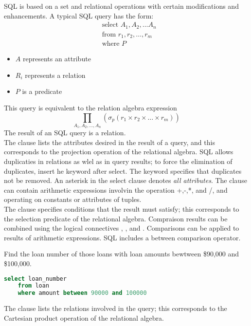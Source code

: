 \documentclass{article}
\begin{document}
SQL is based on a set and relational operations with certain modifications and enhancements. A typical SQL query has the form: 
\begin{align*}
  &\textrm{select } A_1 , A_2 , \dots A_n \\ 
  &\textrm{from } r_1 , r_2 , \dots , r_m \\ 
  &\textrm{where } P 
\end{align*}
\begin{itemize}
  \item $A$ represents an attribute 
  \item $R_i$ represents a relation 
  \item $P$ is a predicate 
\end{itemize}
This query is equivalent to the relation algebra expression $$\prod_{A_1 , A_2 , \dots , A_n}(\sigma_p (r_1 \times r_2 \times \dots \times r_m))$$ The result of an SQL query is a relation. \\ 

The  clause lists the attributes desired in the result of a query, and this corresponds to the projection operation of the relational algebra. SQL allows duplicaties in relations as wlel as in query results; to force the elimination of duplicates, insert he keyword  after select. The keyword  specifies that duplicates not be removed. An asterisk in the select clause denotes \emph{all attributes}. The  clause can contain arithmetic expressions involvin the operation +,-,*, and /, and operating on constants or attributes of tuples. \\ 

The  clause specifies conditions that the result must satisfy; this corresponds to the selection predicate of the relational algebra. Compraison results can be combined using the logical connectives , , and . Comparisons can be applied to results of arithmetic expressions. SQL includes a between comparison operator. 
\begin{example} 
  Find the loan number of those loans with loan amounts bewtween \$90,000 and \$100,000. \\ 
  \begin{lstlisting}[language=SQL]
    select loan_number 
    from loan 
    where amount between 90000 and 100000
  \end{lstlisting}
\end{example}

The  clause lists the relations involved in the query; this corresponds to the Cartesian product operation of the relational algebra. \\ 
\end{document}
